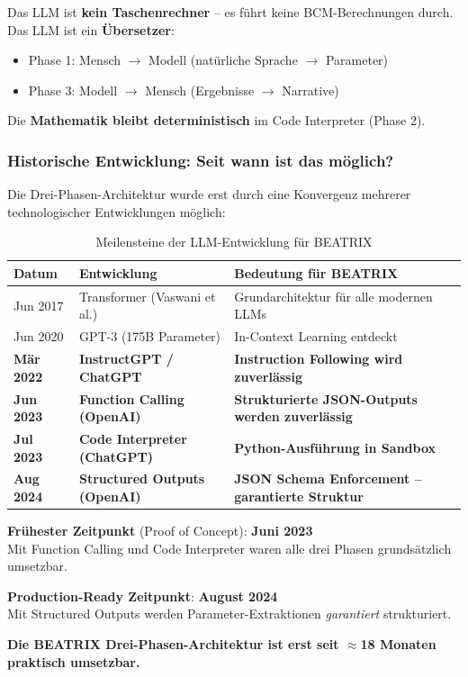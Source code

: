 \begin{tcolorbox}[colback=blue!5!white, colframe=blue!75!black, title=Kernprinzip]
Das LLM ist \textbf{kein Taschenrechner} -- es führt keine BCM-Berechnungen durch.\\
Das LLM ist ein \textbf{Übersetzer}:
\begin{itemize}
    \item Phase 1: Mensch $\rightarrow$ Modell (natürliche Sprache $\rightarrow$ Parameter)
    \item Phase 3: Modell $\rightarrow$ Mensch (Ergebnisse $\rightarrow$ Narrative)
\end{itemize}
Die \textbf{Mathematik bleibt deterministisch} im Code Interpreter (Phase 2).
\end{tcolorbox}

\subsubsection{Historische Entwicklung: Seit wann ist das möglich?}

Die Drei-Phasen-Architektur wurde erst durch eine Konvergenz mehrerer technologischer Entwicklungen möglich:

\begin{table}[h]
\centering
\caption{Meilensteine der LLM-Entwicklung für BEATRIX}
\small
\begin{tabular}{@{}llp{7cm}@{}}
\toprule
\textbf{Datum} & \textbf{Entwicklung} & \textbf{Bedeutung für BEATRIX} \\
\midrule
Jun 2017 & Transformer (Vaswani et al.) & Grundarchitektur für alle modernen LLMs \\
Jun 2020 & GPT-3 (175B Parameter) & In-Context Learning entdeckt \\
\textbf{Mär 2022} & \textbf{InstructGPT / ChatGPT} & \textbf{Instruction Following wird zuverlässig} \\
\textbf{Jun 2023} & \textbf{Function Calling (OpenAI)} & \textbf{Strukturierte JSON-Outputs werden zuverlässig} \\
\textbf{Jul 2023} & \textbf{Code Interpreter (ChatGPT)} & \textbf{Python-Ausführung in Sandbox} \\
\textbf{Aug 2024} & \textbf{Structured Outputs (OpenAI)} & \textbf{JSON Schema Enforcement -- garantierte Struktur} \\
\bottomrule
\end{tabular}
\end{table}

\begin{tcolorbox}[colback=yellow!5!white, colframe=yellow!75!black, title=Zeitliche Einordnung]
\textbf{Frühester Zeitpunkt} (Proof of Concept): \textbf{Juni 2023}\\
Mit Function Calling und Code Interpreter waren alle drei Phasen grundsätzlich umsetzbar.

\textbf{Production-Ready Zeitpunkt}: \textbf{August 2024}\\
Mit Structured Outputs werden Parameter-Extraktionen \textit{garantiert} strukturiert.

\textbf{Die BEATRIX Drei-Phasen-Architektur ist erst seit $\approx$18 Monaten praktisch umsetzbar.}
\end{tcolorbox}

